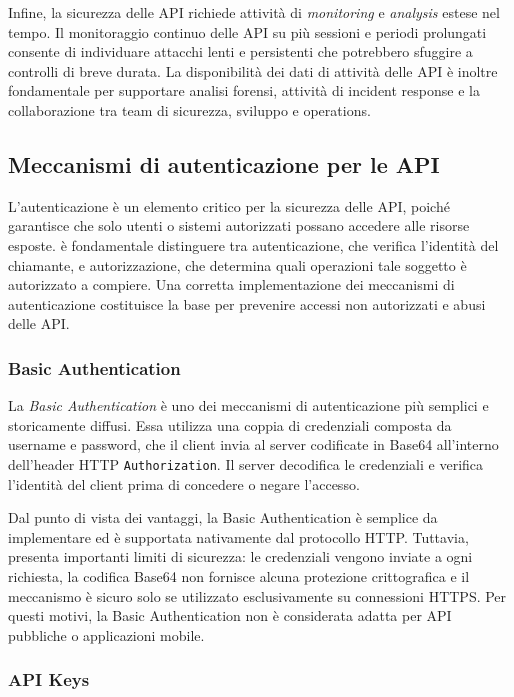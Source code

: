 Infine, la sicurezza delle API richiede attività di \emph{monitoring} e \emph{analysis} estese nel tempo. Il monitoraggio continuo delle API su più sessioni e periodi prolungati consente di individuare attacchi lenti e persistenti che potrebbero sfuggire a controlli di breve durata. La disponibilità dei dati di attività delle API è inoltre fondamentale per supportare analisi forensi, attività di incident response e la collaborazione tra team di sicurezza, sviluppo e operations.

\subsection{Meccanismi di autenticazione per le API}

L’autenticazione è un elemento critico per la sicurezza delle API, poiché garantisce che solo
utenti o sistemi autorizzati possano accedere alle risorse esposte. è fondamentale distinguere tra autenticazione, che verifica l’identità del chiamante, e autorizzazione, che determina quali operazioni tale soggetto è autorizzato a compiere. Una corretta implementazione dei meccanismi di autenticazione costituisce la base per prevenire accessi non autorizzati e abusi delle API.

\subsubsection{Basic Authentication}

La \emph{Basic Authentication} è uno dei meccanismi di autenticazione più semplici e storicamente diffusi. Essa utilizza una coppia di credenziali composta da username e password, che il client invia al server codificate in Base64 all’interno dell’header HTTP \texttt{Authorization}. Il server decodifica le credenziali e verifica l’identità del client prima di concedere o negare l’accesso.

Dal punto di vista dei vantaggi, la Basic Authentication è semplice da implementare ed è supportata nativamente dal protocollo HTTP. Tuttavia, presenta importanti limiti di sicurezza: le credenziali vengono inviate a ogni richiesta, la codifica Base64 non fornisce alcuna protezione crittografica e il meccanismo è sicuro solo se utilizzato esclusivamente su connessioni HTTPS. Per questi motivi, la Basic Authentication non è considerata adatta per API pubbliche o applicazioni mobile.

\subsubsection{API Keys}

